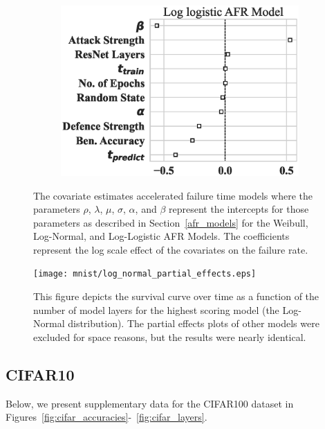 \begin{figure}
\begin{subfigure}[t]{0.3\textwidth}
        \includegraphics[width=\textwidth]{mnist/log_logistic_aft.eps}
    \end{subfigure}
    
    \caption{The covariate estimates accelerated failure time models where the parameters $\rho$, $\lambda$, $\mu$, $\sigma$, $\alpha$, and $\beta$ represent the intercepts for those parameters as described in Section~\ref{afr_models} for the Weibull, Log-Normal, and Log-Logistic AFR Models. The coefficients represent the log scale effect of the covariates on the failure rate.}
    \label{fig:mnist_afr_models}
\end{figure}

\begin{figure}
    \centering\texttt{[image: mnist/log\_normal\_partial\_effects.eps]}
    \caption{This figure depicts the survival curve over time as a function of the number of model layers for the highest scoring model (the Log-Normal distribution). The partial effects plots of other models were excluded for space reasons, but the results were nearly identical.}
    \label{fig:mnist_layers}
\end{figure}

\subsection{CIFAR10}
Below, we present supplementary data for the CIFAR100 dataset in Figures~\ref{fig:cifar_accuracies}-~\ref{fig:cifar_layers}.


